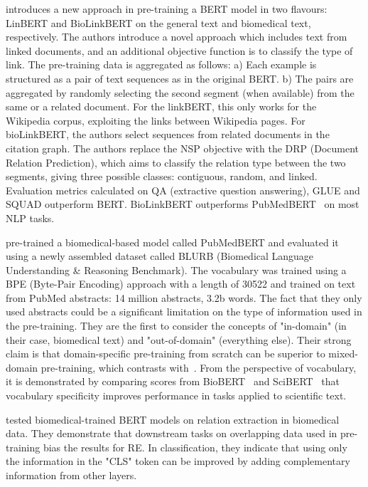 \cite{yasunaga2020linkbert} introduces a new approach in pre-training a BERT model in two flavours: LinBERT and BioLinkBERT on the general text and biomedical text, respectively.
The authors introduce a novel approach which includes text from linked documents, and an additional objective function is to classify the type of link.
The pre-training data is aggregated as follows: a) Each example is structured as a pair of text sequences as in the original BERT. b) The pairs are aggregated by randomly selecting the second segment (when available) from the same or a related document. For the linkBERT, this only works for the Wikipedia corpus, exploiting the links between Wikipedia pages. For bioLinkBERT, the authors select sequences from related documents in the citation graph. 
The authors replace the NSP objective with the DRP (Document Relation Prediction), which aims to classify the relation type between the two segments, giving three possible classes: contiguous, random, and linked.  
Evaluation metrics calculated on QA (extractive question answering), GLUE and SQUAD outperform BERT. BioLinkBERT outperforms PubMedBERT~\cite{gu2020pubmedbert} on most NLP tasks. 

\cite{gu2020pubmedbert} pre-trained a biomedical-based model called PubMedBERT and evaluated it using a newly assembled dataset called BLURB (Biomedical Language Understanding \& Reasoning Benchmark). 
The vocabulary was trained using a BPE (Byte-Pair Encoding) approach with a length of 30522 and trained on text from PubMed abstracts: 14 million abstracts, 3.2b words. 
The fact that they only used abstracts could be a significant limitation on the type of information used in the pre-training. 
They are the first to consider the concepts of "in-domain" (in their case, biomedical text) and "out-of-domain" (everything else). 
Their strong claim is that domain-specific pre-training from scratch can be superior to mixed-domain pre-training, which contrasts with~\cite{hong2022ScholarBERT}. 
From the perspective of vocabulary, it is demonstrated by comparing scores from BioBERT~\cite{lee2019biobert} and SciBERT~\cite{Beltagy2019SciBERT} that vocabulary specificity improves performance in tasks applied to scientific text. 

\cite{su2022investigation} tested biomedical-trained BERT models on relation extraction in biomedical data. They demonstrate that downstream tasks on overlapping data used in pre-training bias the results for RE. In classification, they indicate that using only the information in the "CLS" token can be improved by adding complementary information from other layers. 

